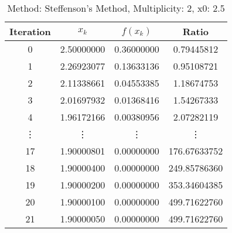 \begin{table}
\centering
\caption{Method: Steffenson's Method, Multiplicity: 2, x0: 2.5}
\label{tab:table_Steffenson's_Method_2_2_5}
\begin{tabular}{c c c c}
\toprule
Iteration &      $x_k$ &   $f(x_k)$ &        Ratio \\
\midrule
        0 & 2.50000000 & 0.36000000 &   0.79445812 \\
        1 & 2.26923077 & 0.13633136 &   0.95108721 \\
        2 & 2.11338661 & 0.04553385 &   1.18674753 \\
        3 & 2.01697932 & 0.01368416 &   1.54267333 \\
        4 & 1.96172166 & 0.00380956 &   2.07282119 \\
   \vdots &     \vdots &     \vdots &       \vdots \\
       17 & 1.90000801 & 0.00000000 & 176.67633752 \\
       18 & 1.90000400 & 0.00000000 & 249.85786360 \\
       19 & 1.90000200 & 0.00000000 & 353.34604385 \\
       20 & 1.90000100 & 0.00000000 & 499.71622760 \\
       21 & 1.90000050 & 0.00000000 & 499.71622760 \\
\bottomrule
\end{tabular}
\end{table}
